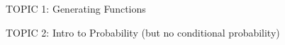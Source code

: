 \documentclass[handout]{mcs}
\begin{document}
\renewcommand{\reading}{
}

\begin{staffnotes}
TOPIC 1: Generating Functions
\end{staffnotes}

\begin{staffnotes}
TOPIC 2: Intro to Probability (but no conditional probability)
\end{staffnotes}

\end{document}
